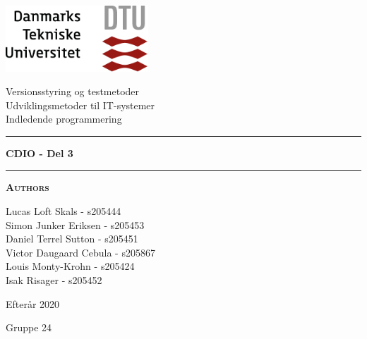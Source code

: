 
\begin{titlepage}
\begin{center}
\vspace{2cm}
\includegraphics[width=0.4\textwidth]{root/dtu.png}~\\[1cm]
\vspace{0.2cm}

 Versionsstyring og testmetoder \\
 Udviklingsmetoder til IT-systemer \\
 Indledende programmering \\

\vspace{1cm}

\hrule
\vspace{.5cm}
{ \huge \bfseries  CDIO - Del 3} %
\vspace{.5cm}

\hrule
\vspace{1.5cm}

\textsc{\textbf{Authors}}\\
\vspace{.5cm}
\centering

Lucas Loft Skals - s205444\\
Simon Junker Eriksen - s205453\\
Daniel Terrel Sutton - s205451\\
Victor Daugaard Cebula - s205867\\
Louis Monty-Krohn - s205424\\
Isak Risager - s205452\\

\vspace{2cm}

\centering  Efterår 2020

\vspace{0.5cm}

\centering  Gruppe 24

\end{center}
\end{titlepage}